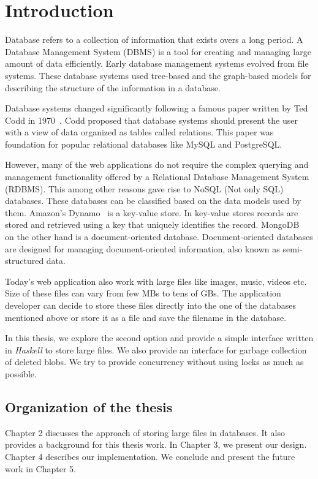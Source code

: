 \chapter{Introduction}
\label{chap:intro}

Database refers to a collection of information that exists overs a long period.
A Database Management System (DBMS) is a tool for creating and managing large amount of data efficiently.
Early database management systems evolved from file systems. These database systems used tree-based and the graph-based models for describing the structure of the information in a database.

Database systems changed significantly following a famous paper written by Ted Codd in 1970~\cite{codd1970relational}. Codd proposed that database systems should present the user with a view of data organized as tables called relations. This paper was foundation for popular relational databases like MySQL and PostgreSQL.

However, many of the web applications do not require the complex querying and management functionality offered by a Relational Database Management System (RDBMS). This among other reasons gave rise to NoSQL (Not only SQL) databases. These databases can be classified based on the data models used by them. Amazon's Dynamo~\cite{decandia2007dynamo} is a key-value store. In key-value stores records are stored and retrieved using a key that uniquely identifies the record.
MongoDB~\cite{chodorow2013mongodb} on the other hand is a document-oriented database. Document-oriented databases are designed for managing document-oriented information, also known as semi-structured data.

Today's web application also work with large files like images, music, videos etc. Size of these files can vary from few MBs to tens of GBs. The application developer can decide to store these files directly into the one of the databases mentioned above or store it as a file and save the filename in the database.

In this thesis, we explore the second option and provide a simple interface written in \textit{Haskell} to store large files. We also provide an interface for garbage collection of deleted blobs. We try to provide concurrency without using locks as much as possible.

\section{Organization of the thesis}
Chapter 2 discusses the approach of storing large files in databases. It also provides a background for this thesis work. In Chapter 3, we present our design. Chapter 4 describes our implementation. We conclude and present the future work in Chapter 5.
